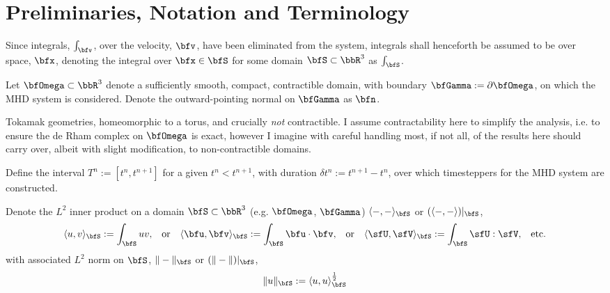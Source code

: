 \section*{Preliminaries, Notation and Terminology}
    Since integrals, $\int_{\bfv}$, over the velocity, $\bfv$, have been eliminated from the system, integrals shall henceforth be assumed to be over space, $\bfx$, denoting the integral over $\bfx  \in  \bfS$ for some domain $\bfS  \subset  \bbR^{3}$ as $\int_{\bfS}$.

    \shortline

    Let $\bfOmega  \subset  \bbR^{3}$ denote a sufficiently smooth, compact, contractible domain, with boundary $\bfGamma  :=  \partial\bfOmega$, on which the MHD system is considered. Denote the outward-pointing normal on $\bfGamma$ as $\bfn$.

    \begin{remark}
        Tokamak geometries, homeomorphic to a torus, and crucially \emph{not} contractible. I assume contractability here to simplify the analysis, i.e. to ensure the de Rham complex on $\bfOmega$ is exact, however I imagine with careful handling most, if not all, of the results here should carry over, albeit with slight modification, to non-contractible domains.
    \end{remark}

    Define the interval $T^{n}  :=  \left[t^{n}, t^{n + 1}\right]$ for a given $t^{n}  <  t^{n + 1}$, with duration $\delta t^{n}  :=  t^{n + 1} - t^{n}$, over which timesteppers for the MHD system are constructed.
    
    \shortline

    Denote the $L^{2}$ inner product on a domain $\bfS  \subset  \bbR^{3}$ (e.g. $\bfOmega$, $\bfGamma$) $\langle-, -\rangle_{\bfS}$ or $(\langle-, -\rangle)|_{\bfS}$,
    \begin{align}
        \langle u,    v   \rangle_{\bfS}  :=  \int_{\bfS}uv,  &&
        \text{or}  &&
        \langle \bfu, \bfv\rangle_{\bfS}  :=  \int_{\bfS}\bfu\cdot\bfv,  &&
        \text{or}  &&
        \langle \sfU, \sfV\rangle_{\bfS}  :=  \int_{\bfS}\sfU:\sfV,  &&
        \text{etc.}
    \end{align}
    with associated $L^{2}$ norm on $\bfS$, $\|-\|_{\bfS}$ or $(\|-\|)|_{\bfS}$,
    \begin{equation}
        \|u\|_{\bfS}  :=  \langle u, u\rangle_{\bfS}^{\frac{1}{2}}
    \end{equation}

